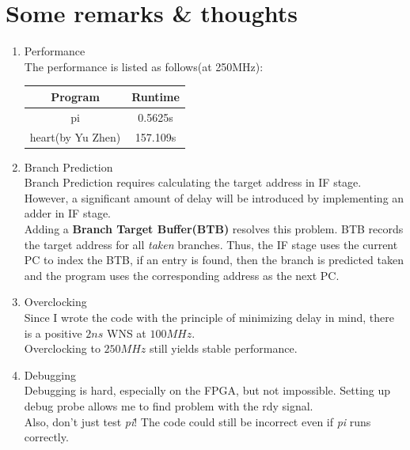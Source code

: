 \documentclass[UTF8, 12pt]{ctexart}
\begin{document}
        \section{Some remarks \& thoughts}
        \begin{enumerate}[label=(\arabic*)]
            \item Performance \\
                The performance is listed as follows(at 250MHz):
                \begin{center}
                    \begin{tabular}{ |c c| } 
                        \hline
                        Program & Runtime \\
                        \hline
                        pi & 0.5625s \\
                        \hline
                        heart(by Yu Zhen) & 157.109s \\
                        \hline
                    \end{tabular}
                \end{center}
            \item Branch Prediction \\
                Branch Prediction requires calculating the target address in IF stage. However, a significant amount of delay will be introduced by implementing an adder in IF stage.\\
                Adding a \textbf{Branch Target Buffer(BTB)} resolves this problem. BTB records the target address for all \textit{taken} branches. Thus, the IF stage uses the current PC to index the BTB,
                if an entry is found, then the branch is predicted taken and the program uses the corresponding address as the next PC. 
            \item Overclocking \\
                Since I wrote the code with the principle of minimizing delay in mind, there is a positive $2ns$ WNS at $100MHz$. \\
                Overclocking to $250MHz$ still yields stable performance.
            \item Debugging \\
                Debugging is hard, especially on the FPGA, but not impossible. Setting up debug probe allows me to find problem with the rdy signal. \\
                Also, don't just test \textit{pi}! The code could still be incorrect even if \textit{pi} runs correctly. 
        \end{enumerate}
\end{document}
